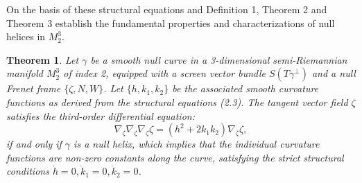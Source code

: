 \documentclass [reqno]{amsart}
\newtheorem{theorem}{Theorem}
\theoremstyle{plain}
\numberwithin{equation}{section}
\begin{document}
On the basis of these structural equations and Definition 1, Theorem 2 and Theorem 3 establish the fundamental properties and characterizations of null helices in $M_2^3$.

\begin{theorem}
Let $\gamma$ be a smooth null curve in a 3-dimensional semi-Riemannian manifold $M_2^3$ of index 2, equipped with a screen vector bundle $S(T\gamma^\perp)$ and a null Frenet frame $\{\zeta,N,W\}$. Let $\{h,k_1,k_2\}$ be the associated smooth curvature functions as derived from the structural equations (2.3). The tangent vector field $\zeta$ satisfies the third-order differential equation:
\begin{equation}
\nabla_\zeta \nabla_\zeta \nabla_\zeta \zeta=(h^2+2k_1 k_2 ) \nabla_\zeta \zeta,
\end{equation}
if and only if $\gamma$ is a null helix, which implies that the individual curvature functions are non-zero constants along the curve, satisfying the strict structural conditions $\dot{h}=0,\dot{k}_1=0,\dot{k}_2=0$.
\end{theorem}
\end{document}
